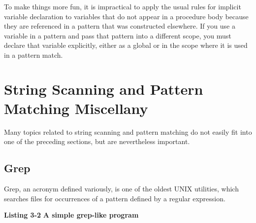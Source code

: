 To make things more fun, it is impractical to apply the usual rules
for implicit variable declaration to variables that do not appear in a
procedure body because they are referenced in a pattern that was
constructed elsewhere.  If you use a variable in a pattern and pass
that pattern into a different scope, you must declare that variable
explicitly, either as a global or in the scope where it is used in a
pattern match.

\section{String Scanning and Pattern Matching Miscellany}

Many topics related to string scanning and pattern matching do not
easily fit into one of the preceding sections, but are nevertheless
important.

\subsection{Grep}

Grep, an acronym defined variously, is one of the oldest UNIX
utilities, which searches files for occurrences of a pattern defined
by a regular expression.

\bigskip

{\sffamily\bfseries Listing 3-2}
{\sffamily\bfseries A simple grep-like program}


